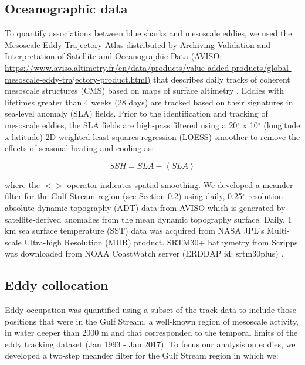 \subsection{Oceanographic data}

To quantify associations between blue sharks and mesoscale eddies, we used the Mesoscale Eddy Trajectory Atlas distributed by Archiving Validation and Interpretation of Satellite and Oceanographic Data (AVISO; \href{https://www.aviso.altimetry.fr/en/data/products/value-added-products/global-mesoscale-eddy-trajectory-product.html}{https://www.aviso.altimetry.fr/en/data/products/value-added-products/global-mesoscale-eddy-trajectory-product.html)} that describes daily tracks of coherent mesoscale structures (CMS) based on maps of surface altimetry \citep{Chelton2011}. Eddies with lifetimes greater than 4 weeks (28 days) are tracked based on their signatures in sea-level anomaly (SLA) fields. Prior to the identification and tracking of mesoscale eddies, the SLA fields are high-pass filtered using a 20$^\circ$ x 10$^\circ$ (longitude x latitude) 2D weighted least-squares regression (LOESS) smoother to remove the effects of seasonal heating and cooling \citep{Chelton2011} as:

\begin{equation}
SSH = SLA - \left<SLA\right>
\label{eq:ssh}
\end{equation}

where the $<>$ operator indicates spatial smoothing. We developed a meander filter for the Gulf Stream region (see Section \cref{sec:eddycoll}) using daily, 0.25$^\circ$ resolution absolute dynamic topography (ADT) data from AVISO which is generated by satellite-derived anomalies from the \citet{Rio2011} mean dynamic topography surface. Daily, 1 km sea surface temperature (SST) data was acquired from NASA JPL's Multi-scale Ultra-high Resolution (MUR) product. SRTM30+ bathymetry from Scripps was downloaded from NOAA CoastWatch server (ERDDAP id: srtm30plus) \citep{Becker2009}.

\subsection{Eddy collocation} \label{sec:eddycoll}

Eddy occupation was quantified using a subset of the track data to include those positions that were in the Gulf Stream, a well-known region of mesoscale activity, in water deeper than 2000 m and that corresponded to the temporal limits of the eddy tracking dataset (Jan 1993 - Jan 2017). To focus our analysis on eddies, we developed a two-step meander filter \citep[similar to ][]{Gaube2017DSR} for the Gulf Stream region in which we: 

